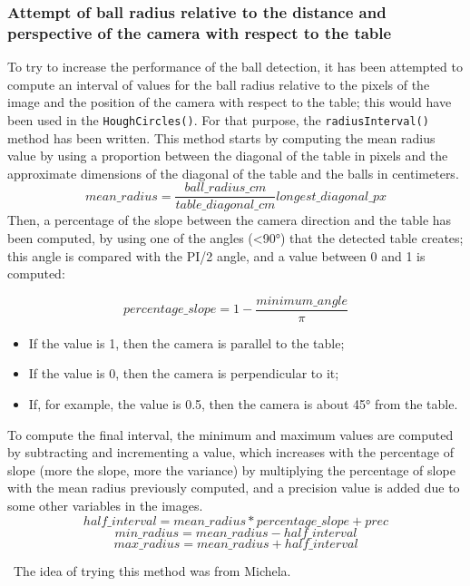 \subsubsection{Attempt of ball radius relative to the distance and perspective of the camera with respect to the table}

To try to increase the performance of the ball detection, it has been attempted to compute an interval of values for the ball radius relative to the pixels of the image and the position of the camera with respect to the table; this would have been used in the \texttt{HoughCircles()}. For that purpose, the \texttt{radiusInterval()} method has been written. This method starts by computing the mean radius value by using a proportion between the diagonal of the table in pixels and the approximate dimensions of the diagonal of the table and the balls in centimeters. 
\begin{equation}
	mean\_radius =  \frac{ball\_radius\_cm}{table\_diagonal\_cm} longest\_diagonal\_px
\end{equation}
Then, a percentage of the slope between the camera direction and the table has been computed, by using one of the angles (<90°) that the detected table creates; this angle is compared with the PI/2 angle, and a value between 0 and 1 is computed:

\begin{equation}
	percentage\_slope = 1 - \frac{minimum\_angle}{\pi}
\end{equation}

\begin{itemize}
	\item If the value is 1, then the camera is parallel to the table;
	\item If the value is 0, then the camera is perpendicular to it;
	\item If, for example, the value is 0.5, then the camera is about 45° from the table.
\end{itemize}
	
To compute the final interval, the minimum and maximum values are computed by subtracting and incrementing a value, which increases with the percentage of slope (more the slope, more the variance) by multiplying the percentage of slope with the mean radius previously computed, and a precision value is added due to some other variables in the images.
\begin{equation}
	half\_interval = mean\_radius*percentage\_slope + prec
\end{equation}
\begin{equation}
	min\_radius = mean\_radius - half\_interval
\end{equation}
\begin{equation}
	max\_radius = mean\_radius + half\_interval
\end{equation}

\
The idea of trying this method was from Michela.
